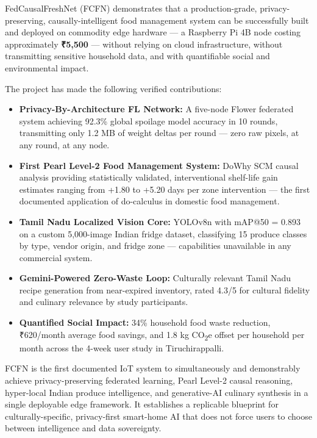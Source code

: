 \documentclass[12pt,a4paper]{report}
\begin{document}
FedCausalFreshNet (FCFN) demonstrates that a production-grade, privacy-preserving, causally-intelligent food management system can be successfully built and deployed on commodity edge hardware — a Raspberry Pi 4B node costing approximately \textbf{₹5,500} — without relying on cloud infrastructure, without transmitting sensitive household data, and with quantifiable social and environmental impact.

The project has made the following verified contributions:

\begin{itemize}[leftmargin=2em, itemsep=0.3em]
    \item \textbf{Privacy-By-Architecture FL Network:} A five-node Flower federated system achieving 92.3\% global spoilage model accuracy in 10 rounds, transmitting only 1.2 MB of weight deltas per round — zero raw pixels, at any round, at any node.

    \item \textbf{First Pearl Level-2 Food Management System:} DoWhy SCM causal analysis providing statistically validated, interventional shelf-life gain estimates ranging from +1.80 to +5.20 days per zone intervention — the first documented application of do-calculus in domestic food management.

    \item \textbf{Tamil Nadu Localized Vision Core:} YOLOv8n with mAP@50 = 0.893 on a custom 5,000-image Indian fridge dataset, classifying 15 produce classes by type, vendor origin, and fridge zone — capabilities unavailable in any commercial system.

    \item \textbf{Gemini-Powered Zero-Waste Loop:} Culturally relevant Tamil Nadu recipe generation from near-expired inventory, rated 4.3/5 for cultural fidelity and culinary relevance by study participants.

    \item \textbf{Quantified Social Impact:} 34\% household food waste reduction, ₹620/month average food savings, and 1.8 kg CO\textsubscript{2}e offset per household per month across the 4-week user study in Tiruchirappalli.
\end{itemize}

FCFN is the first documented IoT system to simultaneously and demonstrably achieve privacy-preserving federated learning, Pearl Level-2 causal reasoning, hyper-local Indian produce intelligence, and generative-AI culinary synthesis in a single deployable edge framework. It establishes a replicable blueprint for culturally-specific, privacy-first smart-home AI that does not force users to choose between intelligence and data sovereignty.
\end{document}
